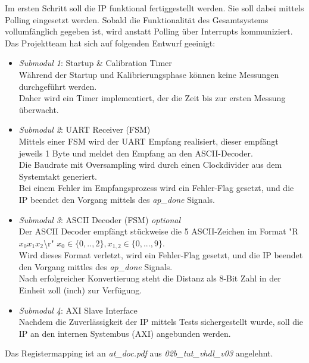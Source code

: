 Im ersten Schritt soll die IP funktional fertiggestellt werden. Sie soll dabei mittels Polling eingesetzt werden. Sobald die Funktionalität des Gesamtsystems vollumfänglich gegeben ist, wird anstatt Polling über Interrupts kommuniziert.\newline
\newline
Das Projektteam hat sich auf folgenden Entwurf geeinigt:

\begin{itemize}
    \item \textit{Submodul 1}: Startup \& Calibration Timer \\
    Während der Startup und Kalibrierungsphase können keine Messungen durchgeführt werden.\\
    Daher wird ein Timer implementiert, der die Zeit bis zur ersten Messung überwacht.
    \item \textit{Submodul 2}: UART Receiver (FSM) \\
    Mittels einer FSM wird der UART Empfang realisiert, dieser empfängt jeweils 1 Byte und meldet den Empfang an den ASCII-Decoder.\\
    Die Baudrate mit Oversampling wird durch einen Clockdivider aus dem Systemtakt generiert.\\
    Bei einem Fehler im Empfangsprozess wird ein Fehler-Flag gesetzt, und die IP beendet den Vorgang mittels des \textit{ap\_done} Signals.
    \item \textit{Submodul 3}: ASCII Decoder (FSM) \textit{optional} \\
    Der ASCII Decoder empfängt stückweise die 5 ASCII-Zeichen im Format "R$x_0 x_ 1 x_ 2$\textbackslash r"
    \newline $x_0 \in \{ 0,..,2\}, x_{1,2} \in \{ 0,...,9 \}$.\\
    Wird dieses Format verletzt, wird ein Fehler-Flag gesetzt, und die IP beendet den Vorgang mittles des \textit{ap\_done} Signals.\\
    Nach erfolgreicher Konvertierung steht die Distanz als 8-Bit Zahl in der Einheit zoll (inch) zur Verfügung.
    \item \textit{Submodul 4}: AXI Slave Interface  \\
    Nachdem die Zuverlässigkeit der IP mittels Tests sichergestellt wurde, soll die IP an den internen Systembus (AXI) angebunden werden.
\end{itemize}

Das Registermapping ist an \textit{at\_doc.pdf} aus \textit{02b\_tut\_vhdl\_v03} angelehnt.


